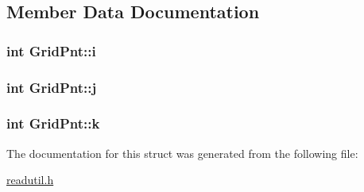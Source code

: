 \subsection{Member Data Documentation}
\hypertarget{structGridPnt_a681ba43b49366bbae8bf253c7d7b187e}{
\subsubsection[{i}]{\setlength{\rightskip}{0pt plus 5cm}int Grid\-Pnt\-::i}}\label{structGridPnt_a681ba43b49366bbae8bf253c7d7b187e}
\hypertarget{structGridPnt_a2a2569f44086eafadc03ff01df5e497f}{
\subsubsection[{j}]{\setlength{\rightskip}{0pt plus 5cm}int Grid\-Pnt\-::j}}\label{structGridPnt_a2a2569f44086eafadc03ff01df5e497f}
\hypertarget{structGridPnt_a9def14770e53c1f741733b686bd1d61f}{
\subsubsection[{k}]{\setlength{\rightskip}{0pt plus 5cm}int Grid\-Pnt\-::k}}\label{structGridPnt_a9def14770e53c1f741733b686bd1d61f}


The documentation for this struct was generated from the following file\-:\begin{DoxyCompactItemize}
\item 
\hyperlink{readutil_8h}{readutil.\-h}\end{DoxyCompactItemize}
